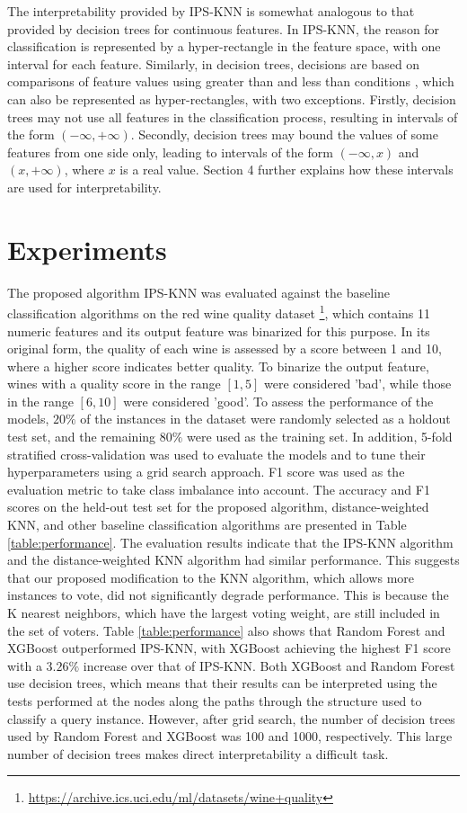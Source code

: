 \documentclass[
]{ceurart}
\begin{document}
The interpretability provided by IPS-KNN is somewhat analogous to that provided by decision trees for continuous features. In IPS-KNN, the reason for classification is represented by a hyper-rectangle in the feature space, with one interval for each feature. Similarly, in decision trees, decisions are based on comparisons of feature values using greater than and less than conditions \cite{de2013decision}, which can also be represented as hyper-rectangles, with two exceptions. Firstly, decision trees may not use all features in the classification process, resulting in intervals of the form $(-\infty,+\infty)$. Secondly, decision trees may bound the values of some features from one side only, leading to intervals of the form $(-\infty,x)$ and $(x,+\infty)$, where $x$ is a real value. Section 4 further explains how these intervals are used for interpretability.

\section{Experiments}
The proposed algorithm IPS-KNN was evaluated against the baseline classification algorithms on the red wine quality dataset \footnote{\url{https://archive.ics.uci.edu/ml/datasets/wine+quality}}, which contains 11 numeric features and its output feature was binarized for this purpose. In its original form, the quality of each wine is assessed by a score between 1 and 10, where a higher score indicates better quality. To binarize the output feature, wines with a quality score in the range $[1,5]$ were considered 'bad', while those in the range $[6, 10]$ were considered 'good'. To assess the performance of the models, $20\%$ of the instances in the dataset were randomly selected as a holdout test set, and the remaining $80\%$ were used as the training set. In addition, 5-fold stratified cross-validation was used to evaluate the models and to tune their hyperparameters using a grid search approach. F1 score was used as the evaluation metric to take class imbalance into account. The accuracy and F1 scores on the held-out test set for the proposed algorithm, distance-weighted KNN, and other baseline classification algorithms are presented in Table \ref{table:performance}. The evaluation results indicate that the IPS-KNN algorithm and the distance-weighted KNN algorithm had similar performance. This suggests that our proposed modification to the KNN algorithm, which allows more instances to vote, did not significantly degrade performance. This is because the K nearest neighbors, which have the largest voting weight, are still included in the set of voters. Table \ref{table:performance} also shows that Random Forest and XGBoost outperformed IPS-KNN, with XGBoost achieving the highest F1 score with a $3.26\%$ increase over that of IPS-KNN. Both XGBoost and Random Forest use decision trees, which means that their results can be interpreted using the tests performed at the nodes along the paths through the structure used to classify a query instance. However, after grid search, the number of decision trees used by Random Forest and XGBoost was 100 and 1000, respectively. This large number of decision trees makes direct interpretability a difficult task.
\end{document}

